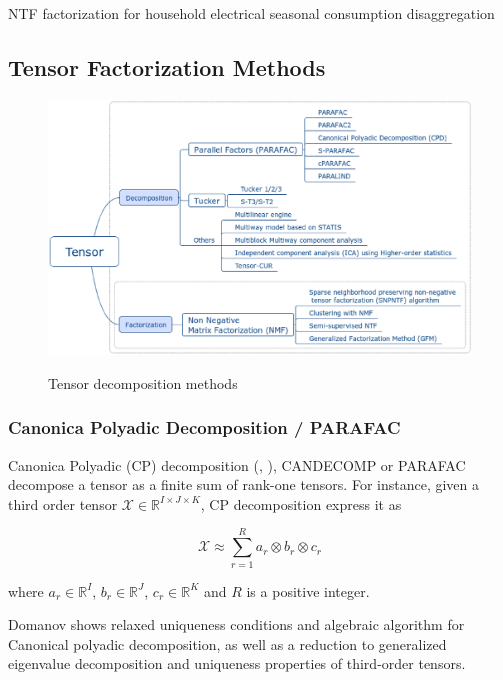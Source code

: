 \documentclass[letterpaper,12pt]{article}
\begin{document}
\cite{Figueiredo2014} NTF factorization for household electrical seasonal consumption disaggregation


\subsection{Tensor Factorization Methods}


\begin{figure}[!ht]
\centering
 \includegraphics[scale=0.5]{Images/tensor_decomposition_methods.eps}\label{fig:methods}
 \caption{Tensor decomposition methods}
\end{figure}

\subsubsection{Canonica Polyadic Decomposition / PARAFAC}

Canonica Polyadic (CP) decomposition (\cite{Kolda2009}, \cite{Mocks1988}), CANDECOMP \cite{Carroll1970} or PARAFAC \cite{Harshman1970} decompose a tensor as a finite sum of rank-one tensors. For instance, given a third order tensor $\mathcal{X}\in\mathbb{R}^{I\times J\times K}$, CP decomposition express it as 

\begin{equation}
 \mathcal{X}\approx \sum_{r=1}^{R}a_r\otimes b_r \otimes c_r
\end{equation}\label{eq:cp}

where $a_r\in\mathbb{R}^I$, $b_r\in\mathbb{R}^J$, $c_r\in\mathbb{R}^K$ and $R$ is a positive integer.



Domanov \cite{Domanov2015} shows relaxed uniqueness conditions and algebraic algorithm for Canonical polyadic decomposition, as well as a reduction to generalized eigenvalue decomposition \cite{Domanov2014} and uniqueness properties \cite{Domanov2013} of third-order tensors.
\end{document}
